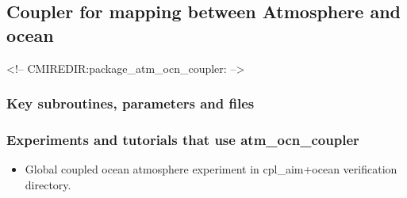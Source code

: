 \subsection{Coupler for mapping between Atmosphere and ocean }
\label{sec:pkg:atm_ocn_coupler}
\begin{rawhtml}
<!-- CMIREDIR:package_atm_ocn_coupler: -->
\end{rawhtml}

\subsubsection{Key subroutines, parameters and files}
\label{sec:pkg:aim_ocn_coupler:implementation_synopsis}

\subsubsection{Experiments and tutorials that use atm\_ocn\_coupler}
\label{sec:pkg:atm_ocn_coupler:experiments}

\begin{itemize}
\item{Global coupled ocean atmosphere experiment in cpl\_aim+ocean verification directory. }
\end{itemize}

